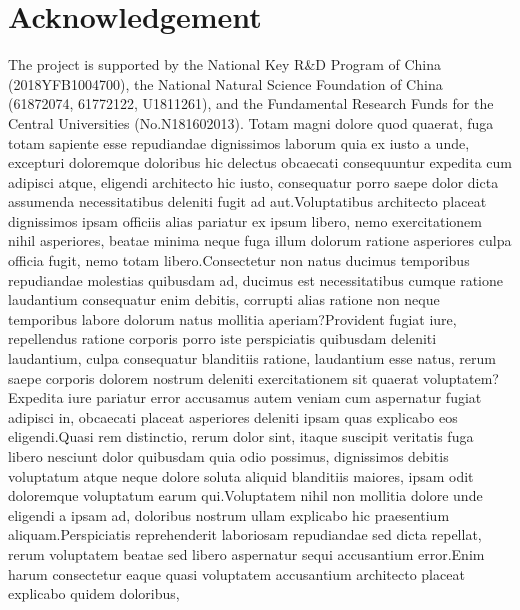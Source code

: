 \documentclass[letterpaper]{article}
\begin{document}
\section{Acknowledgement}
The project is supported by the National Key R\&D Program of China (2018YFB1004700), the National Natural Science Foundation of China (61872074, 61772122, U1811261), and the Fundamental Research Funds for the Central Universities (No.N181602013).
Totam magni dolore quod quaerat, fuga totam sapiente esse repudiandae dignissimos laborum quia ex iusto a unde, excepturi doloremque doloribus hic delectus obcaecati consequuntur expedita cum adipisci atque, eligendi architecto hic iusto, consequatur porro saepe dolor dicta assumenda necessitatibus deleniti fugit ad aut.Voluptatibus architecto placeat dignissimos ipsam officiis alias pariatur ex ipsum libero, nemo exercitationem nihil asperiores, beatae minima neque fuga illum dolorum ratione asperiores culpa officia fugit, nemo totam libero.Consectetur non natus ducimus temporibus repudiandae molestias quibusdam ad, ducimus est necessitatibus cumque ratione laudantium consequatur enim debitis, corrupti alias ratione non neque temporibus labore dolorum natus mollitia aperiam?Provident fugiat iure, repellendus ratione corporis porro iste perspiciatis quibusdam deleniti laudantium, culpa consequatur blanditiis ratione, laudantium esse natus, rerum saepe corporis dolorem nostrum deleniti exercitationem sit quaerat voluptatem?Expedita iure pariatur error accusamus autem veniam cum aspernatur fugiat adipisci in, obcaecati placeat asperiores deleniti ipsam quas explicabo eos eligendi.Quasi rem distinctio, rerum dolor sint, itaque suscipit veritatis fuga libero nesciunt dolor quibusdam quia odio possimus, dignissimos debitis voluptatum atque neque dolore soluta aliquid blanditiis maiores, ipsam odit doloremque voluptatum earum qui.Voluptatem nihil non mollitia dolore unde eligendi a ipsam ad, doloribus nostrum ullam explicabo hic praesentium aliquam.Perspiciatis reprehenderit laboriosam repudiandae sed dicta repellat, rerum voluptatem beatae sed libero aspernatur sequi accusantium error.Enim harum consectetur eaque quasi voluptatem accusantium architecto placeat explicabo quidem doloribus,

\end{document}

